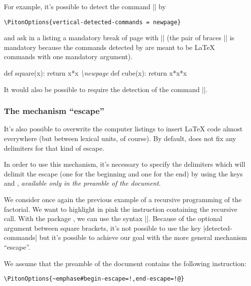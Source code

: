 \documentclass{article}
\begin{document}
\smallskip
For example, it's possible to detect the command |\newpage| by

\begin{Verbatim}
\PitonOptions{vertical-detected-commands = newpage}
\end{Verbatim}

and ask in a listing a mandatory break of page with |\newpage{}| (the pair of braces |{}|
is mandatory because the commands detected by  are meant to be LaTeX commands
with one mandatory argument).

\begin{Code}
\begin{Piton}
def square(x):
    return x*x  \emph{\textbackslash{}newpage{}}
def cube(x):
    return x*x*x
\end{Piton}
\end{Code}

\medskip
It would also be possible to require the detection of the command |\vspace|.

\subsubsection{The mechanism ``escape''}

\label{escape}

It's also possible to overwrite the computer listings to insert LaTeX code
almost everywhere (but between lexical units, of course). By default,
 does not fix any delimiters for that kind of escape.

In order to use this mechanism, it's necessary to specify the delimiters which
will delimit the escape (one for the beginning and one for the end) by using
the keys  and , \emph{available only
in the preamble of the document}.

\medskip
We consider once again the previous example of a recursive programming of
the factorial. We want to highlight in pink the instruction containing the
recursive call. With the package , we can use the syntax
||. Because of the optional argument between square
brackets, it's not possible to use the key |detected-commands| but it's
possible to achieve our goal with the more general mechanism ``escape''.

\medskip
We assume that the preamble of the document contains the following
instruction:

\begin{Verbatim}
\PitonOptions{~emphase#begin-escape=!,end-escape=!@}
\end{Verbatim}
\end{document}
